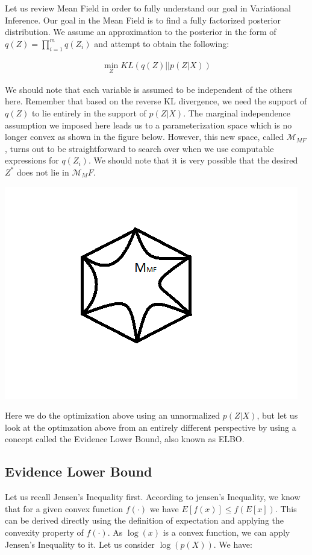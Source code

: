 \documentclass[twoside]{article}
\begin{document}
Let us review Mean Field in order to fully understand our goal in Variational Inference. Our goal in the Mean Field is to find a fully factorized posterior distribution. We assume an approximation to the posterior in the form of $q(Z)=\prod_{i=1}^m{q(Z_i)}$ and attempt to obtain the following:

\begin{eqnarray*}
\min_{Z}{KL(q(Z)||p(Z|X))} 
\end{eqnarray*}

We should note that each variable is assumed to be independent of the others here. Remember that based on the reverse KL divergence, we need the support of $q(Z)$ to lie entirely in the support of $p(Z|X)$. The marginal independence assumption we imposed here leads us to a parameterization space which is no longer convex as shown in the figure below. However, this new space, called $\mathcal{M}_{MF}$,  turns out to be straightforward to search over when we use  computable expressions for $q(Z_i)$. We should note that it is very possible that the desired $Z^*$ does not lie in $\mathcal{M}_MF$. 

\begin{center}
\includegraphics{convexpolytope}
\end{center}

Here we do the optimization above using an unnormalized $p(Z|X)$, but let us look at the optimzation above from an entirely different perspective by using a concept called the Evidence Lower Bound, also known as ELBO. 


\subsection{Evidence Lower Bound}
Let us recall Jensen's Inequality first. According to jensen's Inequality, we know that for a given convex function $f(\cdot)$ we have $E[f(x)] \leq f(E[x])$. This can be derived directly using the definition of expectation and applying the convexity property of $f(\cdot)$. As $\log(x)$ is a convex function, we can apply Jensen's Inequality to it. Let us consider $\log(p(X))$. We have:\\
\end{document}
